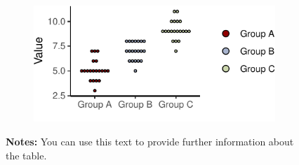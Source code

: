 \documentclass[12pt,a4paper,oneside]{article} %
\begin{document}
\begin{figure}

\caption{\label{fig-dotplot}Visualizing distributions with few
observations}

{\centering 

\begin{figure}[H]

{\centering \includegraphics{example_paper_files/figure-pdf/dotplot-1.pdf}

}

\end{figure}

\hypertarget{fig-dotplot-1}{}
\vspace{-10pt}
\begin{minipage}{0.9\textwidth}
\scriptsize
\singlespacing
\textbf{Notes:} You can use this text to provide further information about the table. \lipsum[66]
\end{minipage}
\vspace{15pt}

}

\end{figure}

\lipsum[1-2]
\end{document}
